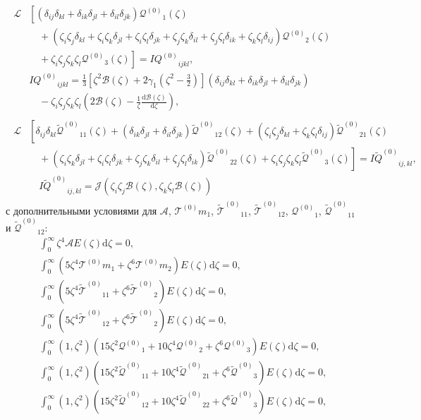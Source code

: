 \documentclass[a4paper,12pt]{article}
\newcommand{\dd}{\mathrm{d}}
\newcommand{\der}[2][]{\frac{\dd#1}{\dd#2}}
\newcommand{\Q}{\ensuremath{\mathcal{Q}^{(0)}}}
\newcommand{\T}[1][0]{\ensuremath{\mathcal{T}^{(#1)}}}
\newcommand{\TT}{\ensuremath{\tilde{\mathcal{T}}^{(0)}}}
\newcommand{\QQ}{\ensuremath{\tilde{\mathcal{Q}}^{(0)}}}
\newcommand{\IF}[2][0]{\ensuremath{I{#2}^{(#1)}}}
\newcommand{\IFF}[1]{\ensuremath{I\tilde{#1}^{(0)}}}
\newcommand{\ZZD}[3]{\zeta_{#1}\zeta_{#2}\delta_{#3}}
\newcommand{\ZZZZ}{\zeta_i\zeta_j\zeta_k\zeta_l}
\newcommand{\DD}[2]{\delta_{#1}\delta_{#2}}
\begin{document}
\begin{gather}
    \begin{aligned}
    \mathcal{L}&\left[(\DD{ij}{kl}+\DD{ik}{jl}+\DD{il}{jk}) \Q_1(\zeta) \right. \\
        &\quad + \left.(\ZZD{i}{j}{kl}+\ZZD{i}{k}{jl}+\ZZD{i}{l}{jk}+\ZZD{j}{k}{il}+\ZZD{j}{l}{ik}+\ZZD{k}{l}{ij}) \Q_2(\zeta)\right. \\
        &\quad + \left.\ZZZZ \Q_3(\zeta)\right] = \IF{Q}_{ijkl}, \\
        & \IF{Q}_{ijkl} = \frac13\left[\zeta^2\mathcal{B}(\zeta)+2\gamma_1\left(\zeta^2-\frac32\right)\right](\DD{ij}{kl}+\DD{ik}{jl}+\DD{il}{jk}) \\
        &\quad - \ZZZZ\left(2\mathcal{B}(\zeta) - \frac1\zeta\der[\mathcal{B}(\zeta)]{\zeta}\right),
    \end{aligned}\label{eq:Q}\\[6pt]
    \begin{aligned}
    \mathcal{L}&\left[\DD{ij}{kl}\QQ_{11}(\zeta) + (\DD{ik}{jl}+\DD{il}{jk})\QQ_{12}(\zeta) + (\ZZD{i}{j}{kl}+\ZZD{k}{l}{ij})\QQ_{21}(\zeta) \right. \\
        &\quad + \left.(\ZZD{i}{k}{jl}+\ZZD{i}{l}{jk}+\ZZD{j}{k}{il}+\ZZD{j}{l}{ik}) \QQ_{22}(\zeta) + \ZZZZ \QQ_3(\zeta)\right] = \IFF{Q}_{ij,kl}, \\
        &\quad \IFF{Q}_{ij,kl} = \mathcal{J}(\zeta_i\zeta_j\mathcal{B}(\zeta), \zeta_k\zeta_l\mathcal{B}(\zeta))
    \end{aligned}\label{eq:QQ}
\end{gather}
с дополнительными условиями для \(\mathcal{A}\), \(\T{m}_1\), \(\TT_{11}\), \(\TT_{12}\), \(\Q_1\), \(\QQ_{11}\) и \(\QQ_{12}\):
\begin{gather}
    \int_0^\infty \zeta^4 \mathcal{A} E(\zeta) \dd\zeta = 0, \label{eq:A_constraint}\\
    \int_0^\infty \left( 5\zeta^4\T{m}_1 + \zeta^6\T{m}_2 \right) E(\zeta) \dd\zeta = 0, \label{eq:Tm_constraint}\\
    \int_0^\infty \left( 5\zeta^4\TT_{11} + \zeta^6\TT_2 \right) E(\zeta) \dd\zeta = 0, \label{eq:T11_constraint}\\
    \int_0^\infty \left( 5\zeta^4\TT_{12} + \zeta^6\TT_2 \right) E(\zeta) \dd\zeta = 0, \label{eq:T12_constraint}\\
    \int_0^\infty (1,\zeta^2)\left( 15\zeta^2\Q_1 + 10\zeta^4\Q_2 + \zeta^6\Q_3 \right) E(\zeta) \dd\zeta = 0, \\
    \int_0^\infty (1,\zeta^2)\left( 15\zeta^2\QQ_{11} + 10\zeta^4\QQ_{21} + \zeta^6\QQ_3 \right) E(\zeta) \dd\zeta = 0, \\
    \int_0^\infty (1,\zeta^2)\left( 15\zeta^2\QQ_{12} + 10\zeta^4\QQ_{22} + \zeta^6\QQ_3 \right) E(\zeta) \dd\zeta = 0,
\end{gather}
\end{document}
